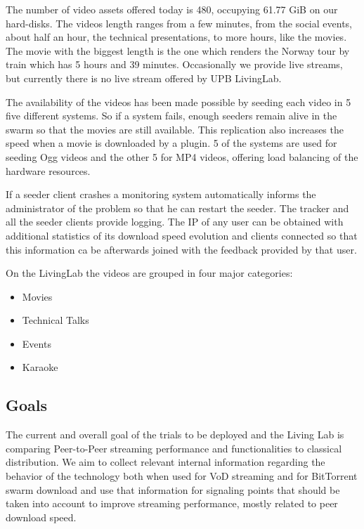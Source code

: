 The number of video assets offered today is 480, occupying 61.77 GiB on our
hard-disks. The videos length ranges from a few minutes, from the social
events, about half an hour, the technical presentations, to more hours, like
the movies. The movie with the biggest length is the one which renders the
Norway tour by train which has 5 hours and 39 minutes. Occasionally we provide
live streams, but currently there is no live stream offered by UPB LivingLab.

The availability of the videos has been made possible by seeding each video in
5 five different systems. So if a system fails, enough seeders remain alive in
the swarm so that the movies are still available. This replication also
increases the speed when a movie is downloaded by a plugin. 5 of the systems
are used for seeding Ogg videos and the other 5 for MP4 videos, offering load
balancing of the hardware resources.

If a seeder client crashes a monitoring system automatically informs the
administrator of the problem so that he can restart the seeder. The tracker
and all the seeder clients provide logging. The IP of any user can be obtained
with additional statistics of its download speed evolution and clients
connected so that this information ca be afterwards joined with the feedback
provided by that user.

On the LivingLab the videos are grouped in four major categories:
\begin{itemize}
  \item Movies
  \item Technical Talks
  \item Events
  \item Karaoke
\end{itemize}

\subsection{Goals}
\label{subsec:multimedia-dist:evaluation-goals}

The current and overall goal of the trials to be deployed and the Living
Lab is comparing Peer-to-Peer streaming performance and functionalities to
classical distribution. We aim to collect relevant internal information
regarding the behavior of the technology both when used for VoD streaming and
for BitTorrent swarm download and use that information for signaling points
that should be taken into account to improve streaming performance, mostly
related to peer download speed.

